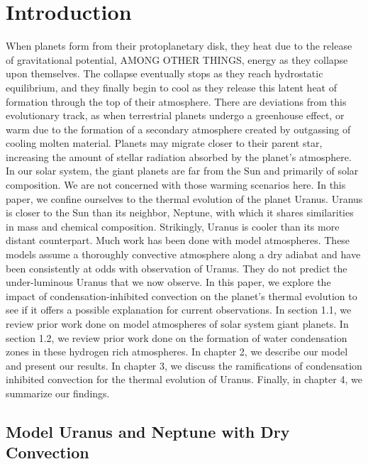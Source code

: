\documentclass[11pt]{ucscthesisbs}
\begin{document}
\chapter{Introduction}
When planets form from their protoplanetary disk, they heat due to the release of gravitational potential, AMONG OTHER THINGS, energy as they collapse upon themselves. The collapse eventually stops as they reach hydrostatic equilibrium, and they finally begin to cool as they release this latent heat of formation through the top of their atmosphere. There are deviations from this evolutionary track, as when terrestrial planets undergo a greenhouse effect, or warm due to the formation of a secondary atmosphere created by outgassing of cooling molten material. Planets may migrate closer to their parent star, increasing the amount of stellar radiation absorbed by the planet's atmosphere. In our solar system, the giant planets are far from the Sun and primarily of solar composition. We are not concerned with those warming scenarios here. In this paper, we confine ourselves to the thermal evolution of the planet Uranus. Uranus is closer to the Sun than its neighbor, Neptune, with which it shares similarities in mass and chemical composition. Strikingly, Uranus is cooler than its more distant counterpart. Much work has been done with model atmospheres. These models assume a thoroughly convective atmosphere along a dry adiabat and have been consistently at odds with observation of Uranus. They do not predict the under-luminous Uranus that we now observe. In this paper, we explore the impact of condensation-inhibited convection on the planet's thermal evolution to see if it offers a possible explanation for current observations. In section 1.1, we review prior work done on model atmospheres of solar system giant planets. In section 1.2, we review prior work done on the formation of water condensation zones in these hydrogen rich atmospheres. In chapter 2, we describe our model and present our results. In chapter 3, we discuss the ramifications of condensation inhibited convection for the thermal evolution of Uranus. Finally, in chapter 4, we summarize our findings.\citep{friedson_2017} \citep{leconte_2017} \citep{pollack_1977}\citep{fortney_2011} \citep{graboske_1975} \citep{guillot_2019} \citep{guillot_1995}



\section{Model Uranus and Neptune with Dry Convection}\label{model_atmosphere_background}
\end{document}
